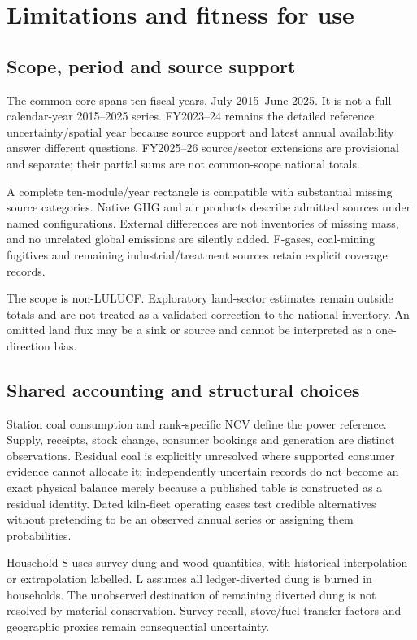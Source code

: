\section{Limitations and fitness for use}
\label{sec:limitations}
\subsection{Scope, period and source support}
\label{lim:single-year}\label{lim:series-basis}\label{lim:incomplete-floor}
The common core spans ten fiscal years, July 2015--June 2025. It is not a full calendar-year 2015--2025 series. FY2023--24 remains the detailed reference uncertainty/spatial year because source support and latest annual availability answer different questions. FY2025--26 source/sector extensions are provisional and separate; their partial sums are not common-scope national totals.

A complete ten-module/year rectangle is compatible with substantial missing source categories. Native GHG and air products describe admitted sources under named configurations. External differences are not inventories of missing mass, and no unrelated global emissions are silently added. F-gases, coal-mining fugitives and remaining industrial/treatment sources retain explicit coverage records.

\label{lim:lulucf}
The scope is non-LULUCF. Exploratory land-sector estimates remain outside totals and are not treated as a validated correction to the national inventory. An omitted land flux may be a sink or source and cannot be interpreted as a one-direction bias.

\subsection{Shared accounting and structural choices}
\label{lim:soft-partitions}\label{lim:firewood}
Station coal consumption and rank-specific NCV define the power reference. Supply, receipts, stock change, consumer bookings and generation are distinct observations. Residual coal is explicitly unresolved where supported consumer evidence cannot allocate it; independently uncertain records do not become an exact physical balance merely because a published table is constructed as a residual identity. Dated kiln-fleet operating cases test credible alternatives without pretending to be an observed annual series or assigning them probabilities.

Household S uses survey dung and wood quantities, with historical interpolation or extrapolation labelled. L assumes all ledger-diverted dung is burned in households. The unobserved destination of remaining diverted dung is not resolved by material conservation. Survey recall, stove/fuel transfer factors and geographic proxies remain consequential uncertainty.

